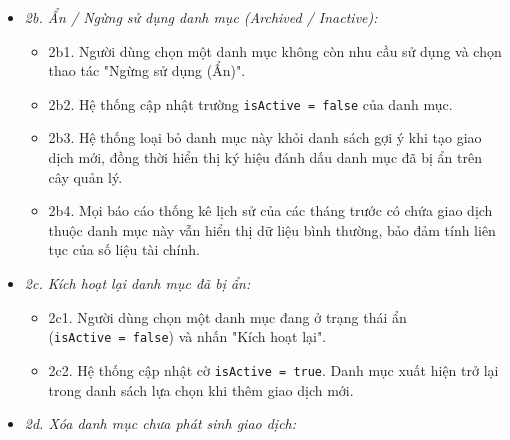 \documentclass[11pt,a4paper]{article}
\providecommand{\tightlist}{
  \setlength{\itemsep}{0pt}\setlength{\parskip}{0pt}}
\begin{document}
\begin{itemize}
\begin{itemize}
    \begin{itemize}
    \tightlist
    \item
      2a1. Người dùng chọn một danh mục cụ thể trên cây phân cấp và nhấn
      "Đổi tên".
    \item
      2a2. Hệ thống hiển thị hộp thoại cho phép chỉnh sửa tên hiển thị.
    \item
      2a3. Người dùng nhập tên mới và xác nhận lưu.
    \item
      2a4. Hệ thống kiểm tra tên mới không trùng lặp với các danh mục
      khác trong cùng nhóm.
    \item
      2a5. Hệ thống cập nhật tên danh mục trong cơ sở dữ liệu. Toàn bộ
      các giao dịch trong quá khứ liên kết với \texttt{categoryId} này
      sẽ tự động hiển thị theo tên mới mà không bị phá vỡ liên kết khóa
      ngoại.
    \item
      2a6. Hệ thống hiển thị thông báo đổi tên thành công.
    \end{itemize}
  \item
    \emph{2b. Ẩn / Ngừng sử dụng danh mục (Archived / Inactive):}

    \begin{itemize}
    \tightlist
    \item
      2b1. Người dùng chọn một danh mục không còn nhu cầu sử dụng và
      chọn thao tác "Ngừng sử dụng (Ẩn)".
    \item
      2b2. Hệ thống cập nhật trường \texttt{isActive\ =\ false} của danh
      mục.
    \item
      2b3. Hệ thống loại bỏ danh mục này khỏi danh sách gợi ý khi tạo
      giao dịch mới, đồng thời hiển thị ký hiệu đánh dấu danh mục đã bị
      ẩn trên cây quản lý.
    \item
      2b4. Mọi báo cáo thống kê lịch sử của các tháng trước có chứa giao
      dịch thuộc danh mục này vẫn hiển thị dữ liệu bình thường, bảo đảm
      tính liên tục của số liệu tài chính.
    \end{itemize}
  \item
    \emph{2c. Kích hoạt lại danh mục đã bị ẩn:}

    \begin{itemize}
    \tightlist
    \item
      2c1. Người dùng chọn một danh mục đang ở trạng thái ẩn
      (\texttt{isActive\ =\ false}) và nhấn "Kích hoạt lại".
    \item
      2c2. Hệ thống cập nhật cờ \texttt{isActive\ =\ true}. Danh mục
      xuất hiện trở lại trong danh sách lựa chọn khi thêm giao dịch mới.
    \end{itemize}
  \item
    \emph{2d. Xóa danh mục chưa phát sinh giao dịch:}


\end{itemize}
\end{itemize}
\end{document}
